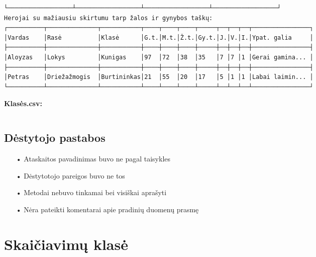 \documentclass{article}
\begin{document}
\begin{verbatim}
└──────────────────┴──────────────────┴──────────────────┴──────────────────┘
Herojai su mažiausiu skirtumu tarp žalos ir gynybos taškų:
┌──────────┬──────────────┬───────────┬────┬────┬────┬─────┬──┬──┬──┬────────────────┐
│Vardas    │Rasė          │Klasė      │G.t.│M.t.│Ž.t.│Gy.t.│J.│V.│I.│Ypat. galia     │
├──────────┼──────────────┼───────────┼────┼────┼────┼─────┼──┼──┼──┼────────────────┤
│Aloyzas   │Lokys         │Kunigas    │97  │72  │38  │35   │7 │7 │1 │Gerai gamina... │
├──────────┼──────────────┼───────────┼────┼────┼────┼─────┼──┼──┼──┼────────────────┤
│Petras    │Driežažmogis  │Burtininkas│21  │55  │20  │17   │5 │1 │1 │Labai laimin... │
└──────────┴──────────────┴───────────┴────┴────┴────┴─────┴──┴──┴──┴────────────────┘
\end{verbatim}

\normalsize
\begin{changemargin}{0cm}{0cm}
    \textbf{Klasės.csv:}
\end{changemargin}
\inputminted{csharp}{Assets/L1/klases.csv}

\subsection{Dėstytojo pastabos}
\begin{itemize}
    \item[•]Ataskaitos pavadinimas buvo ne pagal taisykles
    \item[•]Dėstytotojo pareigos buvo ne tos
    \item[•]Metodai nebuvo tinkamai bei visiškai aprašyti
    \item[•]Nėra pateikti komentarai apie pradinių duomenų prasmę
\end{itemize}

\newpage



\section{Skaičiavimų klasė}
\end{document}
